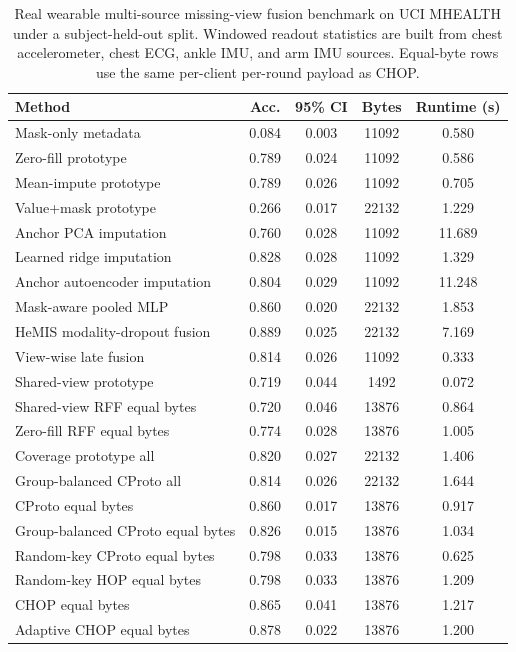 \begin{table}[t]
\centering
\caption{Real wearable multi-source missing-view fusion benchmark on UCI MHEALTH under a subject-held-out split. Windowed readout statistics are built from chest accelerometer, chest ECG, ankle IMU, and arm IMU sources. Equal-byte rows use the same per-client per-round payload as CHOP.}
\label{tab:if-mhealth-fusion}
\scriptsize
\setlength{\tabcolsep}{3pt}
\renewcommand{\arraystretch}{0.94}
\begin{tabular}{lcccc}
\toprule
Method & Acc. & 95\% CI & Bytes & Runtime (s) \\
\midrule
Mask-only metadata & 0.084 & 0.003 & 11092 & 0.580 \\
Zero-fill prototype & 0.789 & 0.024 & 11092 & 0.586 \\
Mean-impute prototype & 0.789 & 0.026 & 11092 & 0.705 \\
Value+mask prototype & 0.266 & 0.017 & 22132 & 1.229 \\
Anchor PCA imputation & 0.760 & 0.028 & 11092 & 11.689 \\
Learned ridge imputation & 0.828 & 0.028 & 11092 & 1.329 \\
Anchor autoencoder imputation & 0.804 & 0.029 & 11092 & 11.248 \\
Mask-aware pooled MLP & 0.860 & 0.020 & 22132 & 1.853 \\
HeMIS modality-dropout fusion & 0.889 & 0.025 & 22132 & 7.169 \\
View-wise late fusion & 0.814 & 0.026 & 11092 & 0.333 \\
Shared-view prototype & 0.719 & 0.044 & 1492 & 0.072 \\
Shared-view RFF equal bytes & 0.720 & 0.046 & 13876 & 0.864 \\
Zero-fill RFF equal bytes & 0.774 & 0.028 & 13876 & 1.005 \\
Coverage prototype all & 0.820 & 0.027 & 22132 & 1.406 \\
Group-balanced CProto all & 0.814 & 0.026 & 22132 & 1.644 \\
CProto equal bytes & 0.860 & 0.017 & 13876 & 0.917 \\
Group-balanced CProto equal bytes & 0.826 & 0.015 & 13876 & 1.034 \\
Random-key CProto equal bytes & 0.798 & 0.033 & 13876 & 0.625 \\
Random-key HOP equal bytes & 0.798 & 0.033 & 13876 & 1.209 \\
CHOP equal bytes & 0.865 & 0.041 & 13876 & 1.217 \\
Adaptive CHOP equal bytes & 0.878 & 0.022 & 13876 & 1.200 \\
\bottomrule
\end{tabular}
\end{table}
